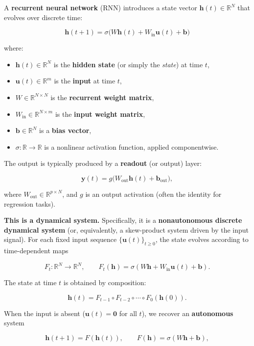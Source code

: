 A \textbf{recurrent neural network} (RNN) introduces a state vector $\mathbf{h}(t) \in \mathbb{R}^N$ that evolves over discrete time:

\[
\boxed{\mathbf{h}(t+1) = \sigma\!\big(W\mathbf{h}(t) + W_{\text{in}}\mathbf{u}(t) + \mathbf{b}\big)}
\]

where:

\begin{itemize}[nosep]
  \item $\mathbf{h}(t) \in \mathbb{R}^N$ is the \textbf{hidden state} (or simply the \textit{state}) at time $t$,
  \item $\mathbf{u}(t) \in \mathbb{R}^m$ is the \textbf{input} at time $t$,
  \item $W \in \mathbb{R}^{N \times N}$ is the \textbf{recurrent weight matrix},
  \item $W_{\text{in}} \in \mathbb{R}^{N \times m}$ is the \textbf{input weight matrix},
  \item $\mathbf{b} \in \mathbb{R}^N$ is a \textbf{bias vector},
  \item $\sigma: \mathbb{R} \to \mathbb{R}$ is a nonlinear activation function, applied componentwise.
\end{itemize}

The output is typically produced by a \textbf{readout} (or output) layer:

\[
\mathbf{y}(t) = g\!\big(W_{\text{out}}\mathbf{h}(t) + \mathbf{b}_{\text{out}}\big),
\]

where $W_{\text{out}} \in \mathbb{R}^{p \times N}$, and $g$ is an output activation (often the identity for regression tasks).

\textbf{This is a dynamical system.} Specifically, it is a \textbf{nonautonomous discrete dynamical system} (or, equivalently, a skew-product system driven by the input signal). For each fixed input sequence $\{\mathbf{u}(t)\}_{t \geq 0}$, the state evolves according to time-dependent maps

\[
F_t: \mathbb{R}^N \to \mathbb{R}^N, \qquad F_t(\mathbf{h}) = \sigma(W\mathbf{h} + W_{\text{in}}\mathbf{u}(t) + \mathbf{b}).
\]

The state at time $t$ is obtained by composition:

\[
\mathbf{h}(t) = F_{t-1} \circ F_{t-2} \circ \cdots \circ F_0(\mathbf{h}(0)).
\]

When the input is absent ($\mathbf{u}(t) = \mathbf{0}$ for all $t$), we recover an \textbf{autonomous} system

\[
\mathbf{h}(t+1) = F(\mathbf{h}(t)), \qquad F(\mathbf{h}) = \sigma(W\mathbf{h} + \mathbf{b}),
\]

